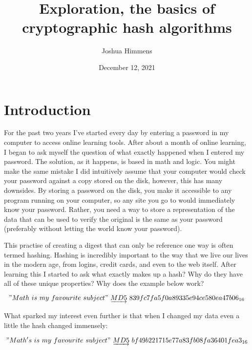 \documentclass[11pt, oneside]{article}   	%
\title{Exploration, the basics of cryptographic hash algorithms}
\author{Joshua Himmens}
\date{December 12, 2021}							%
\begin{document}
\maketitle

\section{Introduction}

For the past two years I’ve started every day by entering a password in my computer to access online learning tools. After about a month of online learning, I began to ask myself the question of what exactly happened when I entered my password. The solution, as it happens, is based in math and logic. You might make the same mistake I did intuitively assume that your computer would check your password against a copy stored on the disk, however, this has many downsides. By storing a password on the disk, you make it accessible to any program running on your computer, so any site you go to would immediately know your password. Rather, you need a way to store a representation of the data that can be used to verify the original is the same as your password (preferably without letting the world know your password).

This practise of creating a digest that can only be reference one way is often termed hashing. Hashing is incredibly important to the way that we live our lives in the modern age, from logins, credit cards, and even to the web itself. After learning this I started to ask what exactly makes up a hash? Why do they have all of these unique properties? Why does the example below work?

\begin{equation}
"Math\ is\ my\ favourite\ subject"\  \underrightarrow{MD 5} \  839fc7fa5f0a89335e94ce580ea47b06_{16}
\end{equation}

What sparked my interest even further is that when I changed my data even a little the hash
changed immensely:

\begin{equation}
"Math's\ is\ my\ favourite\ subject"\  \underrightarrow{MD 5} \  bf49b221715e77a83fb08fa36401fea3_{16}
\end{equation}
\end{document}
